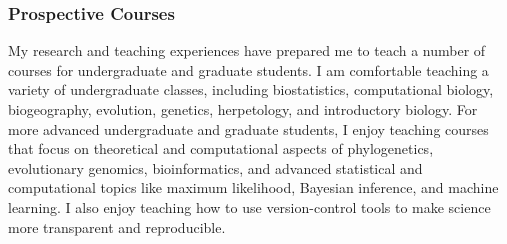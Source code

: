 

\subsubsection*{Prospective Courses}


My research and teaching experiences have prepared me to teach a number of
courses for undergraduate and graduate students.
I am comfortable teaching a variety of undergraduate classes, including
biostatistics,
computational biology,
biogeography,
evolution,
genetics,
herpetology,
and
introductory biology.
For more advanced undergraduate and graduate students, I enjoy teaching courses
that focus on theoretical and computational aspects of
phylogenetics,
evolutionary genomics,
bioinformatics,
and
advanced statistical and computational topics like
maximum likelihood,
Bayesian inference,
and
machine learning.
I also enjoy teaching how to use version-control tools to make science more
transparent and reproducible.

